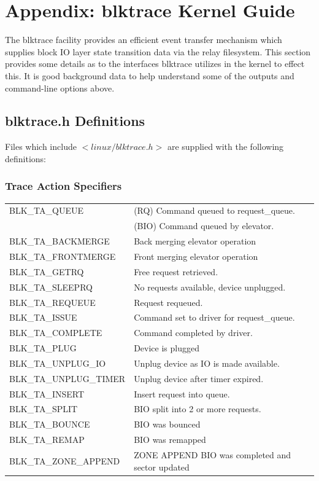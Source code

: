 \documentclass{article}
\begin{document}
\newpage
\newpage\section*{\label{sec:blktrace-kg}Appendix: blktrace Kernel Guide}

The blktrace facility provides an efficient event transfer mechanism which
supplies block IO layer state transition data via the relay
filesystem. This section provides some details as to the interfaces
blktrace utilizes in the kernel to effect this. It is good background data
to help understand some of the outputs and command-line options above.

\subsection{blktrace.h Definitions}
Files which include $<linux/blktrace.h>$ are supplied with the following
definitions:

\subsubsection{Trace Action Specifiers}
\begin{tabular}{|l|l|}\hline
  BLK\_TA\_QUEUE & (RQ) Command queued to request\_queue. \\
                 & (BIO) Command queued by elevator. \\ \hline
  BLK\_TA\_BACKMERGE & Back merging elevator operation \\ \hline
  BLK\_TA\_FRONTMERGE & Front merging elevator operation \\ \hline
  BLK\_TA\_GETRQ & Free request retrieved. \\ \hline
  BLK\_TA\_SLEEPRQ & No requests available, device unplugged. \\ \hline
  BLK\_TA\_REQUEUE & Request requeued. \\ \hline
  BLK\_TA\_ISSUE & Command set to driver for request\_queue. \\ \hline
  BLK\_TA\_COMPLETE & Command completed by driver. \\ \hline
  BLK\_TA\_PLUG & Device is plugged \\ \hline
  BLK\_TA\_UNPLUG\_IO & Unplug device as IO is made available. \\ \hline
  BLK\_TA\_UNPLUG\_TIMER & Unplug device after timer expired. \\ \hline
  BLK\_TA\_INSERT & Insert request into queue. \\ \hline
  BLK\_TA\_SPLIT & BIO split into 2 or more requests. \\ \hline
  BLK\_TA\_BOUNCE & BIO was bounced \\ \hline
  BLK\_TA\_REMAP & BIO was remapped \\ \hline
  BLK\_TA\_ZONE\_APPEND & ZONE APPEND BIO was completed and sector updated\\ \hline
\end{tabular}
\end{document}
